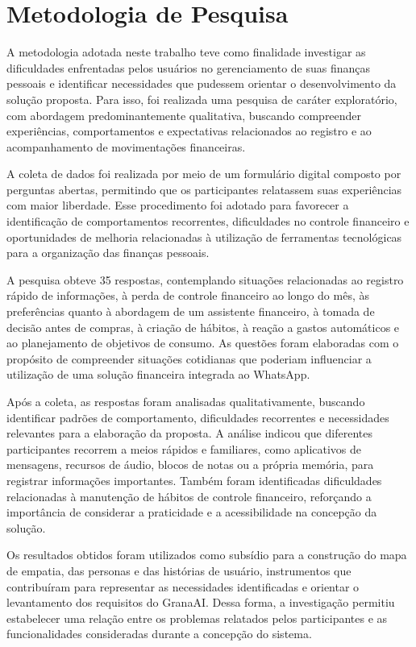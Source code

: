 \chapter{Metodologia de Pesquisa}
\label{cap:metodologia}

A metodologia adotada neste trabalho teve como finalidade investigar as dificuldades enfrentadas pelos usuários no gerenciamento de suas finanças pessoais e identificar necessidades que pudessem orientar o desenvolvimento da solução proposta. Para isso, foi realizada uma pesquisa de caráter exploratório, com abordagem predominantemente qualitativa, buscando compreender experiências, comportamentos e expectativas relacionados ao registro e ao acompanhamento de movimentações financeiras.

A coleta de dados foi realizada por meio de um formulário digital composto por perguntas abertas, permitindo que os participantes relatassem suas experiências com maior liberdade. Esse procedimento foi adotado para favorecer a identificação de comportamentos recorrentes, dificuldades no controle financeiro e oportunidades de melhoria relacionadas à utilização de ferramentas tecnológicas para a organização das finanças pessoais.

A pesquisa obteve 35 respostas, contemplando situações relacionadas ao registro rápido de informações, à perda de controle financeiro ao longo do mês, às preferências quanto à abordagem de um assistente financeiro, à tomada de decisão antes de compras, à criação de hábitos, à reação a gastos automáticos e ao planejamento de objetivos de consumo. As questões foram elaboradas com o propósito de compreender situações cotidianas que poderiam influenciar a utilização de uma solução financeira integrada ao WhatsApp.

Após a coleta, as respostas foram analisadas qualitativamente, buscando identificar padrões de comportamento, dificuldades recorrentes e necessidades relevantes para a elaboração da proposta. A análise indicou que diferentes participantes recorrem a meios rápidos e familiares, como aplicativos de mensagens, recursos de áudio, blocos de notas ou a própria memória, para registrar informações importantes. Também foram identificadas dificuldades relacionadas à manutenção de hábitos de controle financeiro, reforçando a importância de considerar a praticidade e a acessibilidade na concepção da solução.

Os resultados obtidos foram utilizados como subsídio para a construção do mapa de empatia, das personas e das histórias de usuário, instrumentos que contribuíram para representar as necessidades identificadas e orientar o levantamento dos requisitos do GranaAI. Dessa forma, a investigação permitiu estabelecer uma relação entre os problemas relatados pelos participantes e as funcionalidades consideradas durante a concepção do sistema.

